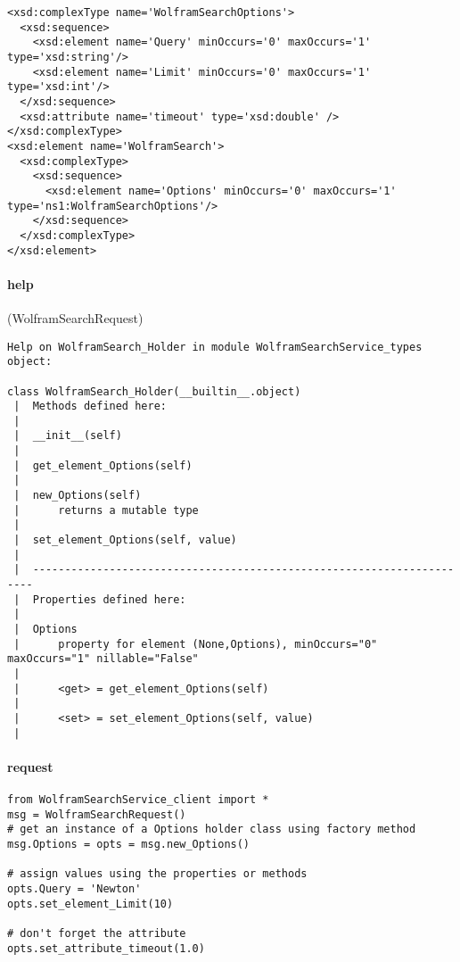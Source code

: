 \begin{verbatim}
<xsd:complexType name='WolframSearchOptions'>
  <xsd:sequence>
    <xsd:element name='Query' minOccurs='0' maxOccurs='1' type='xsd:string'/>
    <xsd:element name='Limit' minOccurs='0' maxOccurs='1' type='xsd:int'/>
  </xsd:sequence>
  <xsd:attribute name='timeout' type='xsd:double' />
</xsd:complexType>
<xsd:element name='WolframSearch'>
  <xsd:complexType>
    <xsd:sequence>
      <xsd:element name='Options' minOccurs='0' maxOccurs='1' type='ns1:WolframSearchOptions'/>
    </xsd:sequence>
  </xsd:complexType>
</xsd:element>
\end{verbatim}
\par

\paragraph{help}(WolframSearchRequest)
\begin{verbatim}
Help on WolframSearch_Holder in module WolframSearchService_types object:

class WolframSearch_Holder(__builtin__.object)
 |  Methods defined here:
 |  
 |  __init__(self)
 |  
 |  get_element_Options(self)
 |  
 |  new_Options(self)
 |      returns a mutable type
 |  
 |  set_element_Options(self, value)
 |  
 |  ----------------------------------------------------------------------
 |  Properties defined here:
 |  
 |  Options
 |      property for element (None,Options), minOccurs="0" maxOccurs="1" nillable="False"
 |  
 |      <get> = get_element_Options(self)
 |  
 |      <set> = set_element_Options(self, value)
 |  
\end{verbatim}
\par

\paragraph{request}
\begin{verbatim}
from WolframSearchService_client import *
msg = WolframSearchRequest()
# get an instance of a Options holder class using factory method
msg.Options = opts = msg.new_Options()

# assign values using the properties or methods
opts.Query = 'Newton'
opts.set_element_Limit(10)

# don't forget the attribute
opts.set_attribute_timeout(1.0)

\end{verbatim}
\par

